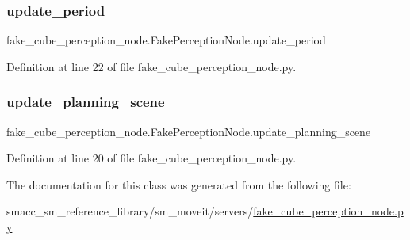 \subsubsection{\texorpdfstring{update\+\_\+period}{update\_period}}
{\footnotesize\ttfamily fake\+\_\+cube\+\_\+perception\+\_\+node.\+Fake\+Perception\+Node.\+update\+\_\+period}



Definition at line 22 of file fake\+\_\+cube\+\_\+perception\+\_\+node.\+py.

\mbox{\label{classfake__cube__perception__node_1_1FakePerceptionNode_a67b87c9f077aefedf69f3e6d9b29ea94}} 
\subsubsection{\texorpdfstring{update\+\_\+planning\+\_\+scene}{update\_planning\_scene}}
{\footnotesize\ttfamily fake\+\_\+cube\+\_\+perception\+\_\+node.\+Fake\+Perception\+Node.\+update\+\_\+planning\+\_\+scene}



Definition at line 20 of file fake\+\_\+cube\+\_\+perception\+\_\+node.\+py.



The documentation for this class was generated from the following file\+:\begin{DoxyCompactItemize}
\item 
smacc\+\_\+sm\+\_\+reference\+\_\+library/sm\+\_\+moveit/servers/\hyperlink{fake__cube__perception__node_8py}{fake\+\_\+cube\+\_\+perception\+\_\+node.\+py}\end{DoxyCompactItemize}
